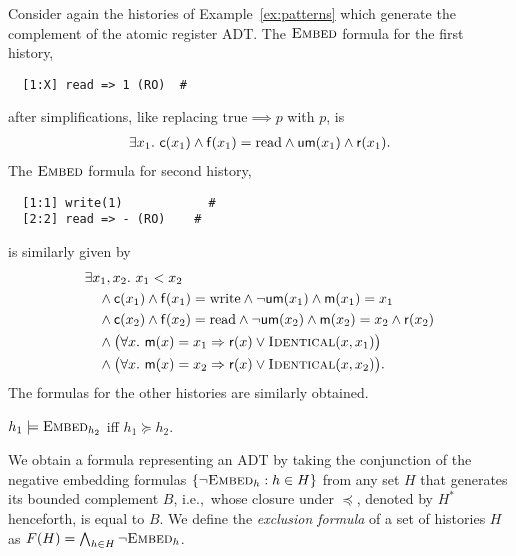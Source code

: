 \begin{example}
  \label{ex:formulas}

  Consider again the histories of Example~\ref{ex:patterns} which generate the
  complement of the atomic register ADT. The $\textsc{Embed}$ formula for the
  first history,
\begin{verbatim}
  [1:X] read => 1 (RO)  #
\end{verbatim}
  after simplifications, like replacing $\mathrm{true} \implies p$ with $p$, is
  \begin{align*}
    \exists x_1.\ {\sf c}(x_1) \land {\sf f}(x_1) = \mathrm{read} \land {\sf um}(x_1) \land {\sf r}(x_1).
  \end{align*}
  The $\textsc{Embed}$ formula for second history,
\begin{verbatim}
  [1:1] write(1)            #
  [2:2] read => - (RO)    #
\end{verbatim}
  is similarly given by
  \begin{align*}
    & \exists x_1, x_2.\ x_1 < x_2 \\
    & \quad \land {\sf c}(x_1) \land {\sf f}(x_1) = \mathrm{write}
      \land \lnot{\sf um}(x_1) \land {\sf m}(x_1) = x_1 \\
    & \quad \land {\sf c}(x_2) \land {\sf f}(x_2) = \mathrm{read}
      \land \lnot{\sf um}(x_2) \land {\sf m}(x_2) = x_2\land {\sf r}(x_2) \\
    & \quad \land \big(\forall x.\ {\sf m}(x) = x_1 \implies {\sf r}(x) \lor \textsc{Identical}(x,x_1)\big) \\
    & \quad \land \big(\forall x.\ {\sf m}(x) = x_2 \implies {\sf r}(x) \lor \textsc{Identical}(x,x_2)\big).
  \end{align*}
  The formulas for the other histories are similarly obtained.

\end{example}

\begin{lemma}\label{lem:formula1}

  $h_1 \models \textsc{Embed}_{h_2}$ if{f} $h_1 \succeq h_2$.

\end{lemma}

We obtain a formula representing an ADT by taking the conjunction of the
negative embedding formulas $\set{ \lnot\textsc{Embed}_h : h \in H }$ from any
set $H$ that generates its bounded complement $B$, i.e.,~whose closure under
$\preceq$, denoted by $H^*$ henceforth, is equal to $B$. We define the
\emph{exclusion formula} of a set of histories $H$ as $F(H) = \bigwedge_{h \in
H} \neg \textsc{Embed}_h$.

